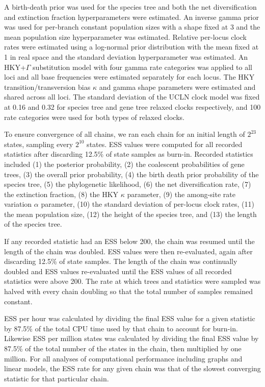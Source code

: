 \documentclass[nogrid]{MBE}%
\begin{document}
A birth-death prior was used for the species tree and both the net
diversification and extinction fraction hyperparameters were estimated. An
inverse gamma prior was used for per-branch constant population sizes with a
shape fixed at 3 and the mean population size hyperparameter was estimated.
Relative per-locus clock rates were estimated using a log-normal prior
distribution with the mean fixed at 1 in real space and the standard deviation
hyperparameter was estimated. An HKY+$\Gamma$ substitution model with four gamma
rate categories was applied to all loci and all base frequencies were estimated
separately for each locus. The HKY transition/transversion bias $\kappa$ and
gamma shape parameters were estimated and shared across all loci. The standard
deviation of the UCLN clock model was fixed at 0.16 and 0.32 for species tree
and gene tree relaxed clocks respectively, and 100 rate categories were used for
both types of relaxed clocks.

To ensure convergence of all chains, we ran each chain for an initial length of
$2^{23}$ states, sampling every $2^{10}$ states. ESS values were computed for
all recorded statistics after discarding 12.5\% of state samples as burn-in.
Recorded statistics included (1) the posterior probability, (2) the coalescent
probabilities of gene trees, (3) the overall prior probability, (4) the birth
death prior probability of the species tree, (5) the phylogenetic likelihood,
(6) the net diversification rate, (7) the extinction fraction, (8) the HKY
$\kappa$ parameter, (9) the among-site rate variation $\alpha$ parameter, (10)
the standard deviation of per-locus clock rates, (11) the mean population size,
(12) the height of the species tree, and (13) the length of the species tree.

If any recorded statistic had an ESS below 200, the chain was resumed until the
length of the chain was doubled. ESS values were then re-evaluated, again after
discarding 12.5\% of state samples. The length of the chain was continually
doubled and ESS values re-evaluated until the ESS values of all recorded
statistics were above 200. The rate at which trees and statistics were sampled
was halved with every chain doubling so that the total number of samples
remained constant.

ESS per hour was calculated by dividing the final ESS value for a given
statistic by 87.5\% of the total CPU time used by that chain to account for
burn-in. Likewise ESS per million states was calculated by dividing the final
ESS value by 87.5\% of the total number of the states in the chain, then
multiplied by one million. For all analyses of computational performance
including graphs and linear models, the ESS rate for any given chain was that of
the slowest converging statistic for that particular chain.
\end{document}
